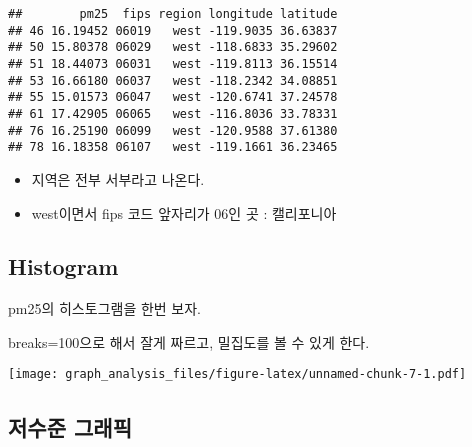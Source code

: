 \documentclass[
]{article}
\newenvironment{Shaded}{\begin{snugshade}}{\end{snugshade}}
\newcommand{\AttributeTok}[1]{\textcolor[rgb]{0.13,0.29,0.53}{#1}}
\newcommand{\CommentTok}[1]{\textcolor[rgb]{0.56,0.35,0.01}{\textit{#1}}}
\newcommand{\DecValTok}[1]{\textcolor[rgb]{0.00,0.00,0.81}{#1}}
\newcommand{\FunctionTok}[1]{\textcolor[rgb]{0.13,0.29,0.53}{\textbf{#1}}}
\newcommand{\NormalTok}[1]{#1}
\newcommand{\SpecialCharTok}[1]{\textcolor[rgb]{0.81,0.36,0.00}{\textbf{#1}}}
\newcommand{\StringTok}[1]{\textcolor[rgb]{0.31,0.60,0.02}{#1}}
\providecommand{\tightlist}{%
  \setlength{\itemsep}{0pt}\setlength{\parskip}{0pt}}
\begin{document}
\begin{Shaded}
\end{Shaded}

\begin{verbatim}
##        pm25  fips region longitude latitude
## 46 16.19452 06019   west -119.9035 36.63837
## 50 15.80378 06029   west -118.6833 35.29602
## 51 18.44073 06031   west -119.8113 36.15514
## 53 16.66180 06037   west -118.2342 34.08851
## 55 15.01573 06047   west -120.6741 37.24578
## 61 17.42905 06065   west -116.8036 33.78331
## 76 16.25190 06099   west -120.9588 37.61380
## 78 16.18358 06107   west -119.1661 36.23465
\end{verbatim}

\begin{itemize}
\tightlist
\item
  지역은 전부 서부라고 나온다.
\item
  west이면서 fips 코드 앞자리가 06인 곳 : 캘리포니아
\end{itemize}

\subsection{Histogram}\label{histogram}

pm25의 히스토그램을 한번 보자.

breaks=100으로 해서 잘게 짜르고, 밀집도를 볼 수 있게 한다.

\begin{Shaded}
\end{Shaded}

\texttt{[image: graph\_analysis\_files/figure-latex/unnamed-chunk-7-1.pdf]}

\subsection{저수준 그래픽}\label{uxc800uxc218uxc900-uxadf8uxb798uxd53d}
\end{document}
